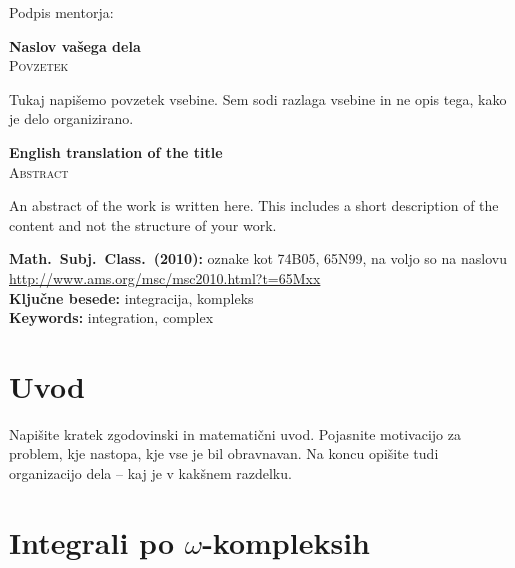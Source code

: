 \documentclass[12pt,a4paper,twoside]{article}
\newcommand{\naslovdela}{Naslov vašega dela}
\newcommand{\kljucnebesede}{integracija\sep kompleks} %
\newcommand{\keywords}{integration\sep complex} %
\newcommand{\sep}{, }  %
\theoremstyle{definition} %
\theoremstyle{plain} %
\numberwithin{equation}{section}  %
\begin{document}
\vspace{2cm}
\hspace*{\fill} Podpis mentorja: \phantom{prostor za podpis}


\cleardoublepage
{}

\begin{center}
\textbf{\naslovdela} \\[3mm]
\textsc{Povzetek} \\[2mm]
\end{center}
Tukaj napišemo povzetek vsebine. Sem sodi razlaga vsebine in ne opis tega, kako je delo
organizirano.

\vfill
\begin{center}
\textbf{English translation of the title} \\[3mm] %
\textsc{Abstract}\\[2mm]
\end{center}

An abstract of the work is written here. This includes a short description of
the content and not the structure of your work.

\vfill\noindent
\textbf{Math.~Subj.~Class.~(2010):} oznake kot 74B05, 65N99, na voljo so na naslovu
\url{http://www.ams.org/msc/msc2010.html?t=65Mxx} \\[1mm]
\textbf{Ključne besede:} \kljucnebesede \\[1mm]
\textbf{Keywords:} \keywords

\cleardoublepage

\setcounter{page}{1}    %

\section{Uvod}
Napišite kratek zgodovinski in matematični uvod.  Pojasnite motivacijo za problem, kje
nastopa, kje vse je bil obravnavan. Na koncu opišite tudi organizacijo dela -- kaj je v kakšnem
razdelku.

\section{Integrali po \texorpdfstring{$\omega$}{ω}-kompleksih}
\end{document}
